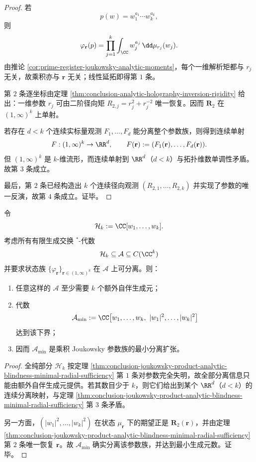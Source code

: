 \begin{proof}
若
\[
p(w)=w_1^{a_1}\cdots w_k^{a_k},
\]
则
\[
\varphi_{\mathbf r}(p)
=
\prod_{j=1}^{k}\int_{\CC} w_j^{a_j}\,\dd\mu_{r_j}(w_j).
\]
由推论 \ref{cor:prime-register-joukowsky-analytic-moments}，每个一维解析矩都与 \(r_j\) 无关，故乘积亦与 \(\mathbf r\) 无关；线性延拓即得第 \(1\) 条。

第 \(2\) 条逐坐标由定理 \ref{thm:conclusion-analytic-holography-inversion-rigidity} 给出：一维参数 \(r_j\) 可由二阶径向矩 \(R_{2,j}=r_j^2+r_j^{-2}\) 唯一恢复。因而 \(\mathbf R_2\) 在 \((1,\infty)^k\) 上单射。

若存在 \(d<k\) 个连续实标量观测 \(F_1,\dots,F_d\) 能分离整个参数族，则得到连续单射
\[
F:(1,\infty)^k\to\RR^d,
\qquad
F(\mathbf r):=(F_1(\mathbf r),\dots,F_d(\mathbf r)).
\]
但 \((1,\infty)^k\) 是 \(k\)-维流形，而连续单射到 \(\RR^d\)（\(d<k\)）与拓扑维数单调性矛盾。故第 \(3\) 条成立。

最后，第 \(2\) 条已经构造出 \(k\) 个连续径向观测 \((R_{2,1},\dots,R_{2,k})\) 并实现了参数的唯一反演，故第 \(4\) 条成立。证毕。
\end{proof}

\begin{corollary}\label{cor:conclusion-joukowsky-product-minimal-star-algebra-resolution}
令
\[
\mathcal H_k:=\CC[w_1,\dots,w_k].
\]
考虑所有有限生成交换 \(^*\)-代数
\[
\mathcal H_k\subseteq \mathcal A\subseteq C(\CC^k)
\]
并要求状态族 \(\{\varphi_{\mathbf r}\}_{\mathbf r\in(1,\infty)^k}\) 在 \(\mathcal A\) 上可分离。则：
\begin{enumerate}
  \item 任意这样的 \(\mathcal A\) 至少需要 \(k\) 个额外自伴生成元；
  \item 代数
        \[
        \mathcal A_{\min}:=\CC\bigl[w_1,\dots,w_k,\ |w_1|^2,\dots,|w_k|^2\bigr]
        \]
        达到该下界；
  \item 因而 \(\mathcal A_{\min}\) 是乘积 Joukowsky 参数族的最小分离扩张。
\end{enumerate}
\end{corollary}

\begin{proof}
全纯部分 \(\mathcal H_k\) 按定理 \ref{thm:conclusion-joukowsky-product-analytic-blindness-minimal-radial-sufficiency} 第 \(1\) 条对参数完全失明，故全部分离信息只能由额外自伴生成元提供。若其数目少于 \(k\)，则它们给出到某个 \(\RR^d\)（\(d<k\)）的连续分离映射，与定理 \ref{thm:conclusion-joukowsky-product-analytic-blindness-minimal-radial-sufficiency} 第 \(3\) 条矛盾。

另一方面，\((|w_1|^2,\dots,|w_k|^2)\) 在状态 \(\mu_{\mathbf r}\) 下的期望正是 \(\mathbf R_2(\mathbf r)\)，并由定理 \ref{thm:conclusion-joukowsky-product-analytic-blindness-minimal-radial-sufficiency} 第 \(2\) 条唯一恢复 \(\mathbf r\)。故 \(\mathcal A_{\min}\) 确实分离该参数族，并达到最小生成元数。证毕。
\end{proof}


